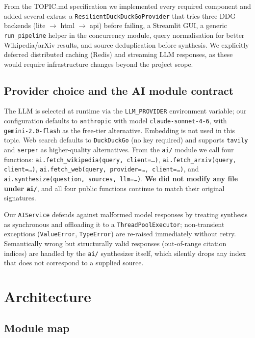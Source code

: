 \documentclass[11pt,a4paper]{article}
\begin{document}
From the TOPIC.md specification we implemented every required component and added
several extras: a \texttt{ResilientDuckDuckGoProvider} that tries three DDG backends
(lite $\to$ html $\to$ api) before failing, a Streamlit GUI, a generic
\texttt{run\_pipeline} helper in the concurrency module, query normalisation for better
Wikipedia/arXiv results, and source deduplication before synthesis. We explicitly
deferred distributed caching (Redis) and streaming LLM responses, as these would
require infrastructure changes beyond the project scope.

\subsection{Provider choice and the AI module contract}

The LLM is selected at runtime via the \texttt{LLM\_PROVIDER} environment variable;
our configuration defaults to \texttt{anthropic} with model \texttt{claude-sonnet-4-6},
with \texttt{gemini-2.0-flash} as the free-tier alternative. Embedding is not used in
this topic. Web search defaults to \texttt{DuckDuckGo} (no key required) and supports
\texttt{tavily} and \texttt{serper} as higher-quality alternatives. From the
\texttt{ai/} module we call four functions:
\texttt{ai.fetch\_wikipedia(query,\,client=\ldots)},
\texttt{ai.fetch\_arxiv(query,\,client=\ldots)},
\texttt{ai.fetch\_web(query,\,provider=\ldots,\,client=\ldots)}, and
\texttt{ai.synthesize(question,\,sources,\,llm=\ldots)}.
\textbf{We did not modify any file under \texttt{ai/}}, and all four public functions
continue to match their original signatures.

Our \texttt{AIService} defends against malformed model responses by treating synthesis
as synchronous and offloading it to a \texttt{ThreadPoolExecutor}; non-transient
exceptions (\texttt{ValueError}, \texttt{TypeError}) are re-raised immediately without
retry. Semantically wrong but structurally valid responses (out-of-range citation
indices) are handled by the \texttt{ai/} synthesizer itself, which silently drops any
index that does not correspond to a supplied source.

\section{Architecture}\label{sec:arch}

\subsection{Module map}
\end{document}
